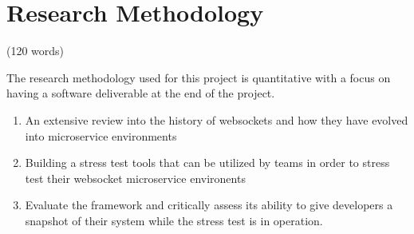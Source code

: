 \chapter{Research Methodology}

(120 words)

The research methodology used for this project is quantitative with a focus on having a software deliverable at the end of the project.

\begin{enumerate}
    \item An extensive review into the history of websockets and how they have evolved into microservice environments
    \item Building a stress test tools that can be utilized by teams in order to stress test their websocket microservice environents
    \item Evaluate the framework and critically assess its ability to give developers a snapshot of their system while the stress test is in operation.
\end{enumerate}